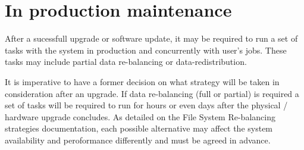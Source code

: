 \documentclass{article}
\begin{document}
\section{In production maintenance}
After a sucessfull upgrade or software update, it may be required to run a set of tasks with the system in production and concurrently with user's jobs. These tasks may include partial data re-balancing or data-redistribution. 

It is imperative to have a former decision on what strategy will be taken in consideration after an upgrade. If data re-balancing (full or partial) is required a set of tasks will be required to run for hours or even days after the physical / hardware upgrade concludes. As detailed on the File System Re-balancing strategies documentation, each possible alternative may affect the system availability and peroformance differently and must be agreed in advance. 
\end{document}
